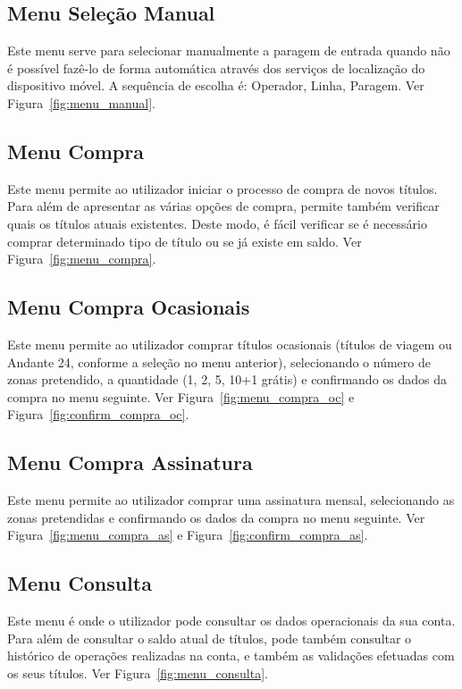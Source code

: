 \subsection{Menu Seleção Manual}

Este menu serve para selecionar manualmente a paragem de entrada quando não é possível fazê-lo de forma automática através dos serviços de localização do dispositivo móvel. A sequência de escolha é: Operador, Linha, Paragem. Ver Figura~\ref{fig:menu_manual}.

\subsection{Menu Compra}

Este menu permite ao utilizador iniciar o processo de compra de novos títulos. Para além de apresentar as várias opções de compra, permite também verificar quais os títulos atuais existentes. Deste modo, é fácil verificar se é necessário comprar determinado tipo de título ou se já existe em saldo. Ver Figura~\ref{fig:menu_compra}.

\subsection{Menu Compra Ocasionais}

Este menu permite ao utilizador comprar títulos ocasionais (títulos de viagem ou Andante 24, conforme a seleção no menu anterior), selecionando o número de zonas pretendido, a quantidade (1, 2, 5, 10+1 grátis) e confirmando os dados da compra no menu seguinte. Ver Figura~\ref{fig:menu_compra_oc} e Figura~\ref{fig:confirm_compra_oc}.

\subsection{Menu Compra Assinatura}

Este menu permite ao utilizador comprar uma assinatura mensal, selecionando as zonas pretendidas e confirmando os dados da compra no menu seguinte. Ver Figura~\ref{fig:menu_compra_as} e Figura~\ref{fig:confirm_compra_as}.

\subsection{Menu Consulta}

Este menu é onde o utilizador pode consultar os dados operacionais da sua conta. Para além de consultar o saldo atual de títulos, pode também consultar o histórico de operações realizadas na conta, e também as validações efetuadas com os seus títulos. Ver Figura~\ref{fig:menu_consulta}.

